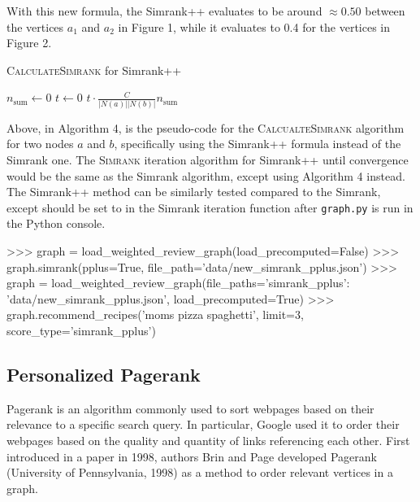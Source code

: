 \documentclass[fontsize=11pt]{article}
\begin{document}
With this new formula, the Simrank++ evaluates to be around $\approx 0.50$ between the vertices $a_1$ and $a_2$ in Figure 1, while it evaluates to 0.4 for the vertices in Figure 2. 

\begin{algorithm}[H]
    \setcounter{AlgoLine}{0}
    \caption{\textsc{CalculateSimrank} for Simrank++}
    $n_{\text{sum}} \gets 0$\;
    $t \gets 0$\;
    \Return $t \cdot \frac{C}{\lvert N(a) \rvert \lvert N(b) \rvert} n_{\text{sum}}$\;
\end{algorithm}

Above, in Algorithm 4, is the pseudo-code for the \textsc{CalcualteSimrank} algorithm for two nodes $a$ and $b$, specifically using the Simrank++ formula instead of the Simrank one. The \textsc{Simrank} iteration algorithm for Simrank++ until convergence would be the same as the Simrank algorithm, except using Algorithm 4 instead. The Simrank++ method can be similarly tested compared to the Simrank, except  should be set to  in the Simrank iteration function after \texttt{graph.py} is run in the Python console.

\begin{python}
>>> graph = load_weighted_review_graph(load_precomputed=False)
>>> graph.simrank(pplus=True, file_path='data/new_simrank_pplus.json')
>>> graph = load_weighted_review_graph(file_paths={'simrank_pplus': 'data/new_simrank_pplus.json'}, load_precomputed=True)
>>> graph.recommend_recipes('moms pizza spaghetti', limit=3, score_type='simrank_pplus')
\end{python}

\subsection{Personalized Pagerank}
Pagerank is an algorithm commonly used to sort webpages based on their relevance to a specific search query. In particular, Google used it to order their webpages based on the quality and quantity of links referencing each other. First introduced in a paper in 1998, authors Brin and Page developed Pagerank (University of Pennsylvania, 1998) as a method to order relevant vertices in a graph. 
\end{document}
